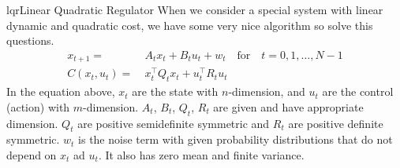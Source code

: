 \documentclass[9pt]{article}
\begin{document}
\begin{topic}{lqr}{Linear Quadratic Regulator}
When we consider a special system with linear dynamic and quadratic cost, we have some very nice algorithm so solve this questions.
\[
\begin{split}
	x_{t+1} = &\ A_{t}x_{t} + B_tu_t + w_t    \quad \text{for} \quad t = 0,1,\ldots,N-1\\
	C(x_t,u_t) = &\ x_t^{\top}Q_tx_t + u_t^{\top}R_tu_t
\end{split}
\]
In the equation above, $x_t$ are the state with $n$-dimension, and $u_t$ are the control (action) with $m$-dimension. $A_t$, $B_t$, $Q_t$, $R_t$ are given and have appropriate dimension. $Q_t$ are positive semidefinite symmetric and $R_t$ are positive definite symmetric. $w_t$ is the noise term with given probability distributions that do not depend on $x_t$ ad $u_t$. It also has zero mean and finite variance.


\end{topic}
\end{document}
